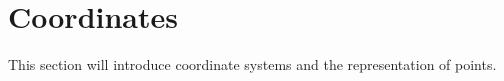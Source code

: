 \section{Coordinates}

This section will introduce coordinate systems and the representation of points.
